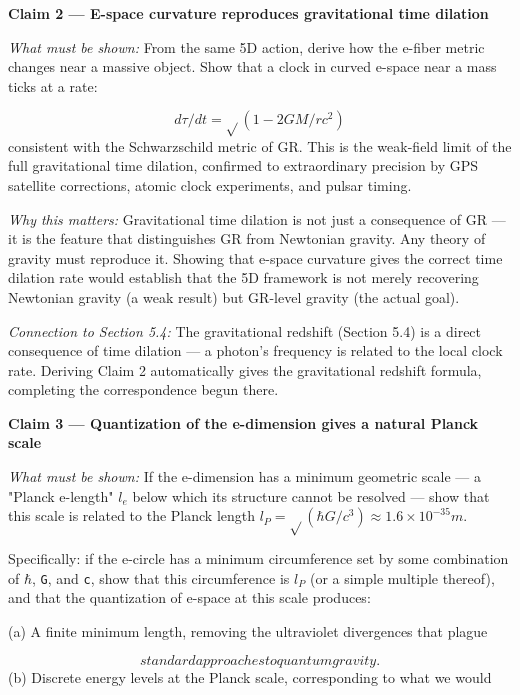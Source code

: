 \documentclass[aps,prd,preprint,superscriptaddress,longbibliography,floatfix]{revtex4-2}
\theoremstyle{remark}
\begin{document}
\textbf{Claim 2 --- E-space curvature reproduces gravitational time dilation}

\textit{What must be shown:} From the same 5D action, derive how the e-fiber metric changes near a massive object. Show that a clock in curved e-space near a mass ticks at a rate:


\begin{equation}
    d\tau/dt = \sqrt{}(1 - 2GM/rc^{2})
\end{equation}
consistent with the Schwarzschild metric of GR. This is the weak-field limit of the full gravitational time dilation, confirmed to extraordinary precision by GPS satellite corrections, atomic clock experiments, and pulsar timing.

\textit{Why this matters:} Gravitational time dilation is not just a consequence of GR --- it is the feature that distinguishes GR from Newtonian gravity. Any theory of gravity must reproduce it. Showing that e-space curvature gives the correct time dilation rate would establish that the 5D framework is not merely recovering Newtonian gravity (a weak result) but GR-level gravity (the actual goal).

\textit{Connection to Section 5.4:} The gravitational redshift (Section 5.4) is a direct consequence of time dilation --- a photon's frequency is related to the local clock rate. Deriving Claim 2 automatically gives the gravitational redshift formula, completing the correspondence begun there.


\textbf{Claim 3 --- Quantization of the e-dimension gives a natural Planck scale}

\textit{What must be shown:} If the e-dimension has a minimum geometric scale --- a "Planck e-length" $l_e$ below which its structure cannot be resolved --- show that this scale is related to the Planck length $l_P = \sqrt{}(\hbar G/c^{3}) \approx 1.6 \times 10^{-35} m$.

Specifically: if the e-circle has a minimum circumference set by some combination of $\hbar$, \texttt{G}, and \texttt{c}, show that this circumference is $l_P$ (or a simple multiple thereof), and that the quantization of e-space at this scale produces:

(a) A finite minimum length, removing the ultraviolet divergences that plague

\begin{equation}
    standard approaches to quantum gravity.
\end{equation}
(b) Discrete energy levels at the Planck scale, corresponding to what we would
\end{document}
